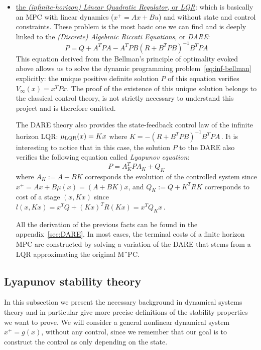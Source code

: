 \documentclass[12pt]{article}
\begin{document}
\begin{itemize}[label=\textbullet]
	\item\underline{the \textit{(infinite-horizon) Linear Quadratic Regulator}, or \textit{LQR}}:\newline
	which is basically an MPC with linear dynamics ($x^+=Ax+Bu$) and without state and control constraints.
	These problem is the most basic one we can find and is deeply linked to the  \textit{(Discrete) Algebraic Riccati Equations}, or \textit{DARE}:
	\begin{equation}
		\label{eq:DARE-LQR}
		P=Q+A^TPA-A^TPB(R+B^TPB)^{-1}B^TPA
	\end{equation}
	This equation derived from the Bellman's principle of optimality evoked above allows us to solve the dynamic programming problem~\ref{eq:inf-bellman} explicitly: the unique positive definite solution $P$ of this equation verifies $V_\infty(x)=x^TPx$.
	The proof of the existence of this unique solution belongs to the classical control theory, is not strictly necessary to understand this project and is therefore omitted.


	The DARE theory also provides the state-feedback control law of the infinite horizon LQR: $\mu_{\rm{LQR}}(x)=Kx$ where $K=-(R+B^TPB)^{-1}B^TPA$\,.
	It is interesting to notice that in this case, the solution $P$ to the DARE also verifies the following equation called \textit{Lyapunov equation}:
	$$P=A_K^TPA_K+Q_K$$
	where $A_K:=A+BK$ corresponds the evolution of the controlled system since $x^+=Ax+B\mu(x)=(A+BK)x$, and $Q_K:=Q+K^TRK$ corresponds to cost of a stage $(x,Kx)$ since $l(x,Kx)=x^TQ+(Kx)^TR(Kx)=x^TQ_Kx$\,.

	All the derivation of the previous facts can be found in the appendix~\ref{sec:DARE}.
	In most cases, the terminal costs of a finite horizon MPC are constructed by solving a variation of the DARE that stems from a LQR approximating the original M¨PC.
\end{itemize}


\subsection{Lyapunov stability theory}\label{sec:Lyapunov-stability-theory}
In this subsection we present the necessary background in dynamical systems theory and in particular give more precise definitions of the stability properties we want to prove.
We will consider a general nonlinear dynamical system $x^+=g(x)$, without any control, since we remember that our goal is to construct the control as only depending on the state.
\end{document}
